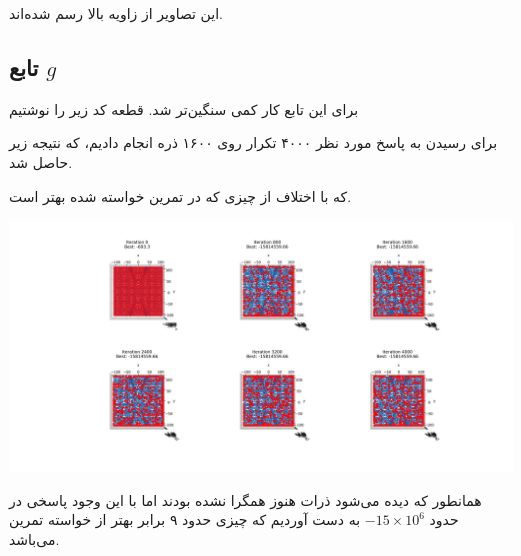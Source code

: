 \documentclass[a4paper, 12pt]{article}
\begin{document}
این تصاویر از زاویه بالا رسم شده‌اند.

\newpage
\subsection{تابع $g$}
برای این تابع کار کمی سنگین‌تر شد. قطعه کد زیر را نوشتیم

\LTR

\RTL

برای رسیدن به پاسخ مورد نظر ۴۰۰۰ تکرار روی ۱۶۰۰ ذره انجام دادیم، که نتیجه زیر حاصل شد.

\LTR

\RTL

که با اختلاف از چیزی که در تمرین خواسته شده بهتر است.

\begin{center}
    \includegraphics[width=1\textwidth]{results/g.png}
\end{center}

همانطور که دیده می‌شود ذرات هنوز همگرا نشده بودند اما با این وجود پاسخی در حدود
$-15 \times 10^6$
به دست آوردیم که چیزی حدود ۹ برابر بهتر از خواسته تمرین می‌باشد.
\end{document}
